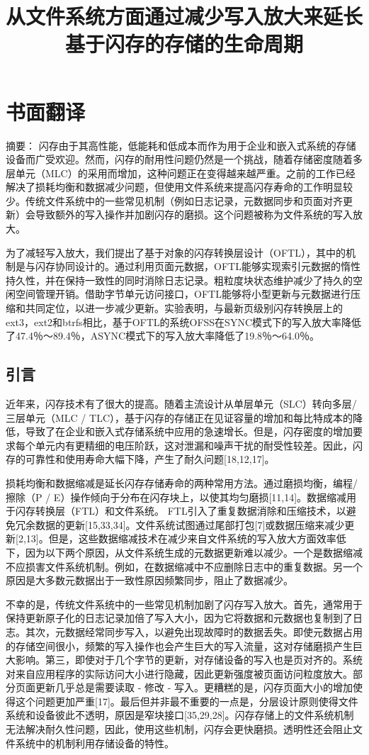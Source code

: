 \chapter{书面翻译}

\title{从文件系统方面通过减少写入放大来延长基于闪存的存储的生命周期}

{\heiti 摘要：} 闪存由于其高性能，低能耗和低成本而作为用于企业和嵌入式系统的存储设备而广受欢迎。然而，闪存的耐用性问题仍然是一个挑战，随着存储密度随着多层单元（MLC）的采用而增加，这种问题正在变得越来越严重。之前的工作已经解决了损耗均衡和数据减少问题，但使用文件系统来提高闪存寿命的工作明显较少。传统文件系统中的一些常见机制（例如日志记录，元数据同步和页面对齐更新）会导致额外的写入操作并加剧闪存的磨损。这个问题被称为文件系统的写入放大。

为了减轻写入放大，我们提出了基于对象的闪存转换层设计（OFTL），其中的机制是与闪存协同设计的。通过利用页面元数据，OFTL能够实现索引元数据的惰性持久性，并在保持一致性的同时消除日志记录。粗粒度块状态维护减少了持久的空闲空间管理开销。借助字节单元访问接口，OFTL能够将小型更新与元数据进行压缩和共同定位，以进一步减少更新。实验表明，与最新页级别闪存转换层上的ext3，ext2和btrfs相比，基于OFTL的系统OFSS在SYNC模式下的写入放大率降低了47.4％〜89.4％，ASYNC模式下的写入放大率降低了19.8％〜64.0％。

\section{引言}
近年来，闪存技术有了很大的提高。随着主流设计从单层单元（SLC）转向多层/三层单元（MLC / TLC），基于闪存的存储正在见证容量的增加和每比特成本的降低，导致了在企业和嵌入式存储系统中应用的急速增长。但是，闪存密度的增加要求每个单元内有更精细的电压阶跃，这对泄漏和噪声干扰的耐受性较差。因此，闪存的可靠性和使用寿命大幅下降，产生了耐久问题[18,12,17]。

损耗均衡和数据缩减是延长闪存存储寿命的两种常用方法。通过磨损均衡，编程/擦除（P / E）操作倾向于分布在闪存块上，以使其均匀磨损[11,14]。数据缩减用于闪存转换层（FTL）和文件系统。 FTL引入了重复数据消除和压缩技术，以避免冗余数据的更新[15,33,34]。文件系统试图通过尾部打包[7]或数据压缩来减少更新[2,13]。但是，这些数据缩减技术在减少来自文件系统的写入放大方面效率低下，因为以下两个原因，从文件系统生成的元数据更新难以减少。一个是数据缩减不应损害文件系统机制。例如，在数据缩减中不应删除日志中的重复数据。另一个原因是大多数元数据出于一致性原因频繁同步，阻止了数据减少。

不幸的是，传统文件系统中的一些常见机制加剧了闪存写入放大。首先，通常用于保持更新原子化的日志记录加倍了写入大小，因为它将数据和元数据也复制到了日志。其次，元数据经常同步写入，以避免出现故障时的数据丢失。即使元数据占用的存储空间很小，频繁的写入操作也会产生巨大的写入流量，这对存储磨损产生巨大影响。第三，即使对于几个字节的更新，对存储设备的写入也是页对齐的。系统对来自应用程序的实际访问大小进行隐藏，因此更新强度被页面访问粒度放大。部分页面更新几乎总是需要读取 - 修改 - 写入。更糟糕的是，闪存页面大小的增加使得这个问题更加严重[17]。最后但并非最不重要的一点是，分层设计原则使得文件系统和设备彼此不透明，原因是窄块接口[35,29,28]。闪存存储上的文件系统机制无法解决耐久性问题，因此，使用这些机制，闪存会更快磨损。透明性还会阻止文件系统中的机制利用存储设备的特性。

